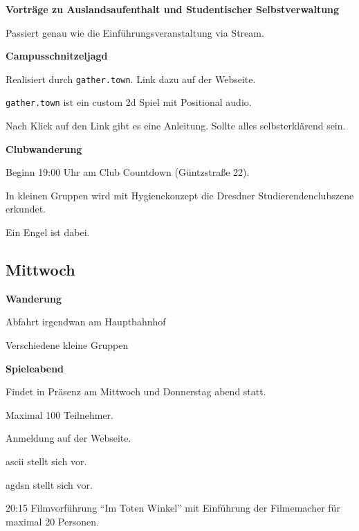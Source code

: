 \documentclass[a4paper,12pt]{scrreprt}
\begin{document}
\textbf{Vorträge zu Auslandsaufenthalt und Studentischer Selbstverwaltung}
\begin{itemize*}
    \item Passiert genau wie die Einführungsveranstaltung via Stream.
\end{itemize*}

\textbf{Campusschnitzeljagd}
\begin{itemize*}
    \item Realisiert durch \texttt{gather.town}. Link dazu auf der Webseite.
    \item \texttt{gather.town} ist ein custom 2d Spiel mit Positional audio.
    \item Nach Klick auf den Link gibt es eine Anleitung. Sollte alles selbsterklärend sein.
\end{itemize*}

\textbf{Clubwanderung}
\begin{itemize*}
    \item Beginn 19:00 Uhr am Club Countdown (Güntzstraße 22).
    \item In kleinen Gruppen wird mit Hygienekonzept die Dresdner Studierendenclubszene erkundet.
    \item Ein Engel ist dabei.
\end{itemize*}


\subsection{Mittwoch}

\textbf{Wanderung}
\begin{itemize*}
    \item Abfahrt irgendwan am Hauptbahnhof
    \item Verschiedene kleine Gruppen
\end{itemize*}


\textbf{Spieleabend}
\begin{itemize*}
    \item Findet in Präsenz am Mittwoch und Donnerstag abend statt.
    \item Maximal 100 Teilnehmer.
    \item Anmeldung auf der Webseite.
    \item ascii stellt sich vor.
    \item agdsn stellt sich vor.
    \item 20:15 Filmvorführung \enquote{Im Toten Winkel} mit Einführung der Filmemacher für maximal 20 Personen.
\end{itemize*}
\end{document}
